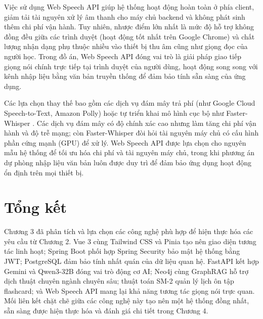 \documentclass[../DoAn.tex]{subfiles}
\begin{document}
Việc sử dụng Web Speech API giúp hệ thống hoạt động hoàn toàn ở phía client, giảm tải tài nguyên xử lý âm thanh cho máy chủ backend và không phát sinh thêm chi phí vận hành. Tuy nhiên, nhược điểm lớn nhất là mức độ hỗ trợ không đồng đều giữa các trình duyệt (hoạt động tốt nhất trên Google Chrome) và chất lượng nhận dạng phụ thuộc nhiều vào thiết bị thu âm cũng như giọng đọc của người học. Trong đồ án, Web Speech API đóng vai trò là giải pháp giao tiếp giọng nói chính trực tiếp tại trình duyệt của người dùng, hoạt động song song với kênh nhập liệu bằng văn bản truyền thống để đảm bảo tính sẵn sàng của ứng dụng.

Các lựa chọn thay thế bao gồm các dịch vụ đám mây trả phí (như Google Cloud Speech-to-Text, Amazon Polly) hoặc tự triển khai mô hình cục bộ như Faster-Whisper \cite{radford2023whisper}. Các dịch vụ đám mây có độ chính xác cao nhưng làm tăng chi phí vận hành và độ trễ mạng; còn Faster-Whisper đòi hỏi tài nguyên máy chủ có cấu hình phần cứng mạnh (GPU) để xử lý. Web Speech API được lựa chọn cho nguyên mẫu hệ thống để tối ưu hóa chi phí và tài nguyên máy chủ, trong khi phương án dự phòng nhập liệu văn bản luôn được duy trì để đảm bảo ứng dụng hoạt động ổn định trên mọi thiết bị.

\section{Tổng kết}
\label{section:3.8}

Chương 3 đã phân tích và lựa chọn các công nghệ phù hợp để hiện thực hóa các yêu cầu từ Chương 2. Vue 3 cùng Tailwind CSS và Pinia tạo nên giao diện tương tác linh hoạt; Spring Boot phối hợp Spring Security bảo mật hệ thống bằng JWT; PostgreSQL đảm bảo tính nhất quán của dữ liệu quan hệ. FastAPI kết hợp Gemini và Qwen3-32B đóng vai trò động cơ AI; Neo4j cùng GraphRAG hỗ trợ dịch thuật chuyên ngành chuyên sâu; thuật toán SM-2 quản lý lịch ôn tập flashcard; và Web Speech API mang lại khả năng tương tác giọng nói trực quan. Mối liên kết chặt chẽ giữa các công nghệ này tạo nên một hệ thống đồng nhất, sẵn sàng được hiện thực hóa và đánh giá chi tiết trong Chương 4.
\end{document}
